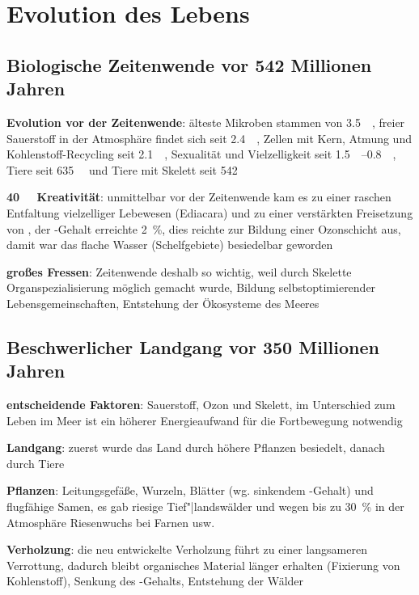 \section{%
    Evolution des Lebens%
}

\subsection{%
    Biologische Zeitenwende vor 542 Millionen Jahren
}

\textbf{Evolution vor der Zeitenwende}:
älteste Mikroben stammen von \SI{3.5}{\giga\year},
freier Sauerstoff in der Atmosphäre findet sich seit \SI{2.4}{\giga\year},
Zellen mit Kern, Atmung und Kohlenstoff-Recycling seit \SI{2.1}{\giga\year},
Sexualität und Vielzelligkeit seit \SIrange{1.5}{0.8}{\giga\year},
Tiere seit \SI{635}{\mega\year} und
Tiere mit Skelett seit \SI{542}{\mega\year}

\textbf{\SI{40}{\mega\year} Kreativität}:
unmittelbar vor der Zeitenwende kam es zu einer raschen Entfaltung vielzelliger
Lebewesen (Ediacara) und zu einer verstärkten Freisetzung von ,
der -Gehalt erreichte \SI{2}{\percent}, dies reichte zur Bildung einer Ozonschicht aus,
damit war das flache Wasser (Schelfgebiete) besiedelbar geworden

\textbf{großes Fressen}:
Zeitenwende deshalb so wichtig, weil durch Skelette Organspezialisierung möglich gemacht wurde,
Bildung selbstoptimierender Lebensgemeinschaften,
Entstehung der Ökosysteme des Meeres

\subsection{%
    Beschwerlicher Landgang vor 350 Millionen Jahren%
}

\textbf{entscheidende Faktoren}:
Sauerstoff, Ozon und Skelett,
im Unterschied zum Leben im Meer ist ein höherer Energieaufwand für die Fortbewegung notwendig

\textbf{Landgang}:
zuerst wurde das Land durch höhere Pflanzen besiedelt, danach durch Tiere

\textbf{Pflanzen}:
Leitungsgefäße, Wurzeln, Blätter (wg. sinkendem -Gehalt)
und flugfähige Samen,
es gab riesige Tief"|landswälder und wegen bis zu \SI{30}{\percent}  in der Atmosphäre
Riesenwuchs bei Farnen usw.

\textbf{Verholzung}:
die neu entwickelte Verholzung führt zu einer langsameren Verrottung,
dadurch bleibt organisches Material länger erhalten (Fixierung von Kohlenstoff),
Senkung des -Gehalts,
Entstehung der Wälder

